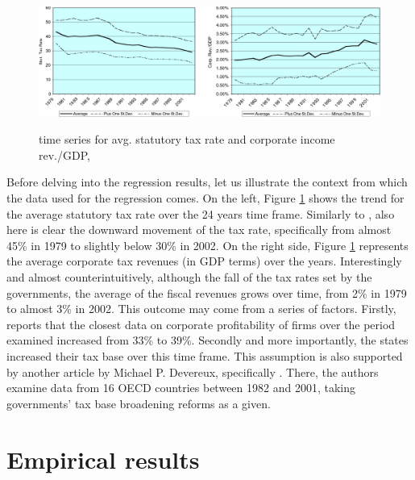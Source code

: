 \begin{figure}[!h]
    \centering
    \captionsetup{font=footnotesize}\caption{time series for avg. statutory tax rate and corporate income rev./GDP, \cite{clausing}}
    \includegraphics[width=.85\textwidth]{img/clausing-trends.jpg}
    \label{clausing-img}
    \vspace{-5pt}
\end{figure}
Before delving into the regression results, let us illustrate the context from which the data used for the regression comes. On the left, Figure \ref{clausing-img} shows the trend for the average statutory tax rate over the 24 years time frame. Similarly to \textcite{dev-loc-red-08}, also here is clear the downward movement of the tax rate, specifically from almost 45\% in 1979 to slightly below 30\% in 2002.  On the right side, Figure \ref{clausing-img} represents the average corporate tax revenues (in GDP terms) over the years. Interestingly and almost counterintuitively, although the fall of the tax rates set by the governments, the average of the fiscal revenues grows over time, from 2\% in 1979 to almost 3\% in 2002. This outcome may come from a series of factors. Firstly, \textcite{clausing} reports that the closest data on corporate profitability of firms over the period examined increased from 33\% to 39\%. Secondly and more importantly, the states increased their tax base over this time frame. This assumption is also supported by another article by Michael P. Devereux, specifically \textcite{dev-2002}. There, the authors examine data from 16 OECD countries between 1982 and 2001, taking governments' tax base broadening reforms as a given.
\vspace{-5pt}
\section{Empirical results}

